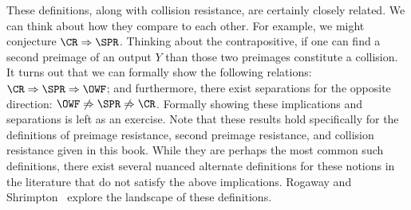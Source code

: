 These definitions, along with collision resistance, are certainly closely related.
We can think about how they compare to each other.
For example, we might conjecture $\CR\Rightarrow\SPR$.
Thinking about the contrapositive, if one can find a second preimage of an output $Y$ than those two preimages constitute a collision.
It turns out that we can formally show the following relations: $\CR\Rightarrow\SPR\Rightarrow\OWF$;
and furthermore, there exist separations for the opposite direction: $\OWF\not\Rightarrow\SPR\not\Rightarrow\CR$.
Formally showing these implications and separations is left as an exercise.
Note that these results hold specifically for the definitions of preimage resistance, second preimage resistance, and collision resistance given in this book.
While they are perhaps the most common such definitions, there exist several nuanced alternate definitions for these notions in the literature that do not satisfy the above implications.
Rogaway and Shrimpton~\cite{RogawayShrimpton04} explore the landscape of these definitions.
